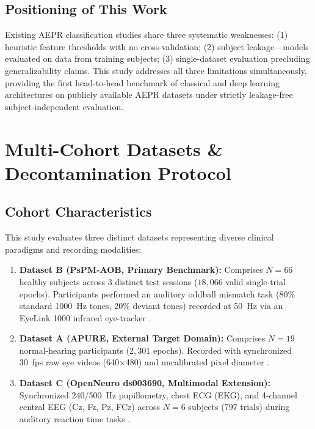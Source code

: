 \documentclass[journal]{IEEEtran}
\begin{document}
\subsection{Positioning of This Work}
Existing AEPR classification studies share three systematic weaknesses: (1) heuristic feature thresholds with no cross-validation; (2) subject leakage—models evaluated on data from training subjects; (3) single-dataset evaluation precluding generalizability claims. This study addresses all three limitations simultaneously, providing the first head-to-head benchmark of classical and deep learning architectures on publicly available AEPR datasets under strictly leakage-free subject-independent evaluation.

\section{Multi-Cohort Datasets \& Decontamination Protocol}

\subsection{Cohort Characteristics}
This study evaluates three distinct datasets representing diverse clinical paradigms and recording modalities:
\begin{enumerate}
    \item \textbf{Dataset B (PsPM-AOB, Primary Benchmark):} Comprises $N = 66$ healthy subjects across 3 distinct test sessions ($18,066$ valid single-trial epochs). Participants performed an auditory oddball mismatch task (80\% standard 1000~Hz tones, 20\% deviant tones) recorded at 50~Hz via an EyeLink 1000 infrared eye-tracker \cite{bach2018pspm}.
    \item \textbf{Dataset A (APURE, External Target Domain):} Comprises $N = 19$ normal-hearing participants ($2,301$ epochs). Recorded with synchronized 30~fps raw eye videos (640$\times$480) and uncalibrated pixel diameter \cite{zhao2024apure}.
    \item \textbf{Dataset C (OpenNeuro ds003690, Multimodal Extension):} Synchronized 240/500~Hz pupillometry, chest ECG (EKG), and 4-channel central EEG (Cz, Fz, Pz, FCz) across $N = 6$ subjects (797 trials) during auditory reaction time tasks \cite{ribeiro2019age, ribeiro2019neural}.
\end{enumerate}
\end{document}
